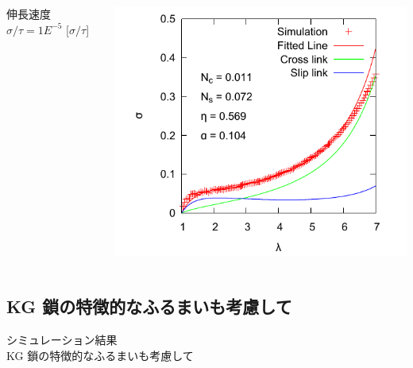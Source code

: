 \documentclass[11pt, dvipdfmx]{beamer}
\begin{document}
\begin{frame}
\begin{columns}[totalwidth=1\textwidth]
\begin{center}
伸長速度 $\sigma/\tau = 1E^{-5}$ [$\sigma/\tau$]
\end{center}
\vspace{-3mm}
\includegraphics[width=\columnwidth]{./fig/E_V_5e-4.pdf}
\end{columns}
\end{frame}

\subsection{KG 鎖の特徴的なふるまいも考慮して}
\begin{frame}
\Large{シミュレーション結果\\KG 鎖の特徴的なふるまいも考慮して}
\end{frame}
\end{document}
